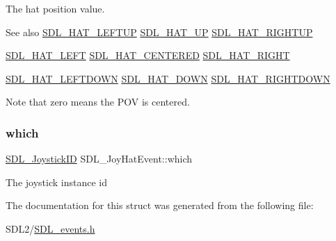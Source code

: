 The hat position value. \begin{DoxySeeAlso}{See also}
\hyperlink{_s_d_l__joystick_8h_a6d7988b43c09ced08ec318a2556f1858}{S\+D\+L\+\_\+\+H\+A\+T\+\_\+\+L\+E\+F\+T\+UP} \hyperlink{_s_d_l__joystick_8h_ac916fe96c0740790e5496e12c67d8889}{S\+D\+L\+\_\+\+H\+A\+T\+\_\+\+UP} \hyperlink{_s_d_l__joystick_8h_a65fde978b4ab9c269c215d1922ae7755}{S\+D\+L\+\_\+\+H\+A\+T\+\_\+\+R\+I\+G\+H\+T\+UP} 

\hyperlink{_s_d_l__joystick_8h_a4666c12cae25d8bab053d8569396cd77}{S\+D\+L\+\_\+\+H\+A\+T\+\_\+\+L\+E\+FT} \hyperlink{_s_d_l__joystick_8h_adbfd6f0bad25cd1bb79f8c0a065f3833}{S\+D\+L\+\_\+\+H\+A\+T\+\_\+\+C\+E\+N\+T\+E\+R\+ED} \hyperlink{_s_d_l__joystick_8h_a5d1844afaf2ceaf58c689a8bd480a543}{S\+D\+L\+\_\+\+H\+A\+T\+\_\+\+R\+I\+G\+HT} 

\hyperlink{_s_d_l__joystick_8h_a3fa8609d382a0f74507890491033c784}{S\+D\+L\+\_\+\+H\+A\+T\+\_\+\+L\+E\+F\+T\+D\+O\+WN} \hyperlink{_s_d_l__joystick_8h_aa87f7a91d6bae8b420b133559d983338}{S\+D\+L\+\_\+\+H\+A\+T\+\_\+\+D\+O\+WN} \hyperlink{_s_d_l__joystick_8h_abf50339da11ca12699ee2199607d275f}{S\+D\+L\+\_\+\+H\+A\+T\+\_\+\+R\+I\+G\+H\+T\+D\+O\+WN}
\end{DoxySeeAlso}
Note that zero means the P\+OV is centered. \mbox{\label{struct_s_d_l___joy_hat_event_ac9d9bb179f9116d16b3da47cacd74b55}} 
\subsubsection{\texorpdfstring{which}{which}}
{\footnotesize\ttfamily \hyperlink{_s_d_l__joystick_8h_a3c3d32500cb08f76ee8077983912c0bd}{S\+D\+L\+\_\+\+Joystick\+ID} S\+D\+L\+\_\+\+Joy\+Hat\+Event\+::which}

The joystick instance id 

The documentation for this struct was generated from the following file\+:\begin{DoxyCompactItemize}
\item 
S\+D\+L2/\hyperlink{_s_d_l__events_8h}{S\+D\+L\+\_\+events.\+h}\end{DoxyCompactItemize}
